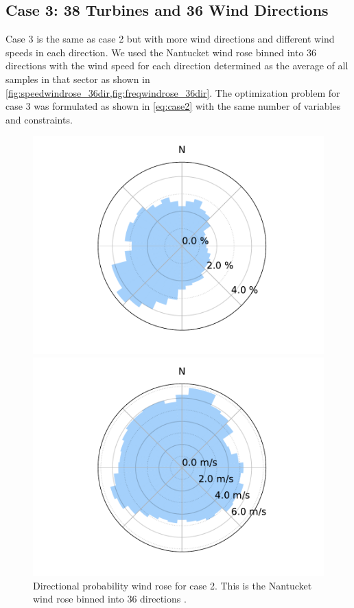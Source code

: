\documentclass{jpconf}
\begin{document}
\subsection{Case 3: 38 Turbines and 36 Wind Directions}
%
Case 3 is the same as case 2 but with more wind directions and different wind speeds in each direction. We used the Nantucket wind rose binned into 36 directions with the wind speed for each direction determined as the average of all samples in that sector as shown in \cref{fig:speedwindrose_36dir,fig:freqwindrose_36dir}. The optimization problem for case 3 was formulated as shown in \cref{eq:case2} with the same number of variables and constraints.
%
\begin{figure}[h!]
	\centering
	\begin{minipage}[t]{18pc}
		\centering
		\includegraphics[width=\textwidth, trim={1.5cm 0cm 1.5cm 0cm}, clip]{final_images/windroses/freqwindrose_36_dir.pdf}
		\caption{Directional probability wind rose for case 2. This is the Nantucket wind rose binned into 36 directions \cite{wrcc2017}.}
		\label{fig:freqwindrose_36dir}
	\end{minipage} \hspace{1pc}%
	\begin{minipage}[t]{18pc}
		\centering
		\includegraphics[width=\textwidth, trim={1.5cm, 0cm, 1.5cm, 0cm}, clip]{final_images/windroses/speedwindrose_36_dir.pdf}

\end{minipage}
\end{figure}
\end{document}
